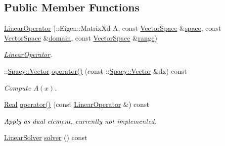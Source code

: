 \subsection*{Public Member Functions}
\begin{DoxyCompactItemize}
\item 
\hyperlink{classSpacy_1_1Rn_1_1LinearOperator_a5766be9cde54684c7318cc0f58fcda4c}{Linear\-Operator} (\-::Eigen\-::\-Matrix\-Xd A, const \hyperlink{classSpacy_1_1VectorSpace}{Vector\-Space} \&\hyperlink{classSpacy_1_1VectorBase_aa999dbf9d679d895dfe04c10fbf9f5e9}{space}, const \hyperlink{classSpacy_1_1VectorSpace}{Vector\-Space} \&\hyperlink{classSpacy_1_1OperatorBase_a2588f9b3e0188820c4c494e63293dc6f}{domain}, const \hyperlink{classSpacy_1_1VectorSpace}{Vector\-Space} \&\hyperlink{classSpacy_1_1OperatorBase_ab19d3b7a6f290b1079248f1e567e53d6}{range})
\begin{DoxyCompactList}\small\item\em \hyperlink{classSpacy_1_1Rn_1_1LinearOperator}{Linear\-Operator}. \end{DoxyCompactList}\item 
\hypertarget{classSpacy_1_1Rn_1_1LinearOperator_a804fce53cb8c2d1937fd0eae41718039}{\-::\hyperlink{classSpacy_1_1Vector}{Spacy\-::\-Vector} \hyperlink{classSpacy_1_1Rn_1_1LinearOperator_a804fce53cb8c2d1937fd0eae41718039}{operator()} (const \-::\hyperlink{classSpacy_1_1Vector}{Spacy\-::\-Vector} \&dx) const }\label{classSpacy_1_1Rn_1_1LinearOperator_a804fce53cb8c2d1937fd0eae41718039}

\begin{DoxyCompactList}\small\item\em Compute $A(x)$. \end{DoxyCompactList}\item 
\hypertarget{classSpacy_1_1Rn_1_1LinearOperator_aa10ed970cfb18e6eaedb890dd0308538}{\hyperlink{classSpacy_1_1Real}{Real} \hyperlink{classSpacy_1_1Rn_1_1LinearOperator_aa10ed970cfb18e6eaedb890dd0308538}{operator()} (const \hyperlink{classSpacy_1_1Rn_1_1LinearOperator}{Linear\-Operator} \&) const }\label{classSpacy_1_1Rn_1_1LinearOperator_aa10ed970cfb18e6eaedb890dd0308538}

\begin{DoxyCompactList}\small\item\em Apply as dual element, currently not implemented. \end{DoxyCompactList}\item 
\hypertarget{classSpacy_1_1Rn_1_1LinearOperator_a82989d016d28e2ae1fe5fa3d65df783d}{\hyperlink{classSpacy_1_1Rn_1_1LinearSolver}{Linear\-Solver} \hyperlink{classSpacy_1_1Rn_1_1LinearOperator_a82989d016d28e2ae1fe5fa3d65df783d}{solver} () const }\label{classSpacy_1_1Rn_1_1LinearOperator_a82989d016d28e2ae1fe5fa3d65df783d}


\end{DoxyCompactItemize}

